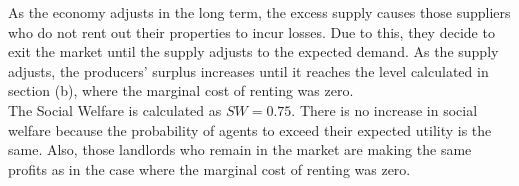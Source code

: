 \begin{myanswerbox}
    As the economy adjusts in the long term, the excess supply causes those suppliers who do not rent out their properties to incur losses. Due to this, they decide to exit the market until the supply adjusts to the expected demand. As the supply adjusts, the producers' surplus increases until it reaches the level calculated in section (b), where the marginal cost of renting was zero.\\

    The Social Welfare is calculated as \( SW = 0.75 \). There is no increase in social welfare because the probability of agents to exceed their expected utility is the same. Also, those landlords who remain in the market are making the same profits as in the case where the marginal cost of renting was zero.\\
\end{myanswerbox}

